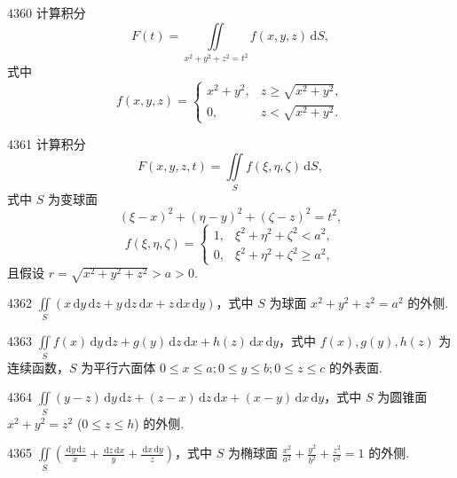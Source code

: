 \begin{prob}[M]{4360}
计算积分
\[
F(t) = \iint\limits_{x^2 + y^2 + z^2 = t^2} f(x, y, z)\,\mathrm{d}S,
\]
式中
\[
f(x, y, z) = \begin{cases} x^2 + y^2, & z \geqslant \sqrt{x^2 + y^2}, \\ 0, & z < \sqrt{x^2 + y^2}. \end{cases}
\]
\end{prob}

\begin{prob}[M]{4361}
计算积分
\[
F(x, y, z, t) = \iint\limits_S f(\xi, \eta, \zeta)\,\mathrm{d}S,
\]
式中 $S$ 为变球面
\[
(\xi - x)^2 + (\eta - y)^2 + (\zeta - z)^2 = t^2,
\]
\[
f(\xi, \eta, \zeta) = \begin{cases} 1, & \xi^2 + \eta^2 + \zeta^2 < a^2, \\ 0, & \xi^2 + \eta^2 + \zeta^2 \geqslant a^2, \end{cases}
\]
且假设 $r = \sqrt{x^2 + y^2 + z^2} > a > 0$.
\end{prob}


\begin{prob}[S]{4362}
$\iint\limits_S (x\,\mathrm{d}y\,\mathrm{d}z + y\,\mathrm{d}z\,\mathrm{d}x + z\,\mathrm{d}x\,\mathrm{d}y)$，式中 $S$ 为球面 $x^2 + y^2 + z^2 = a^2$ 的外侧.
\end{prob}

\begin{prob}[S]{4363}
$\iint\limits_S f(x)\,\mathrm{d}y\,\mathrm{d}z + g(y)\,\mathrm{d}z\,\mathrm{d}x + h(z)\,\mathrm{d}x\,\mathrm{d}y$，式中 $f(x), g(y), h(z)$ 为连续函数，$S$ 为平行六面体 $0 \leqslant x \leqslant a; 0 \leqslant y \leqslant b; 0 \leqslant z \leqslant c$ 的外表面.
\end{prob}

\begin{prob}[S]{4364}
$\iint\limits_S (y - z)\,\mathrm{d}y\,\mathrm{d}z + (z - x)\,\mathrm{d}z\,\mathrm{d}x + (x - y)\,\mathrm{d}x\,\mathrm{d}y$，式中 $S$ 为圆锥面 $x^2 + y^2 = z^2$ ($0 \leqslant z \leqslant h$) 的外侧.
\end{prob}

\begin{prob}[S]{4365}
$\iint\limits_S \left(\frac{\,\mathrm{d}y\,\mathrm{d}z}{x} + \frac{\,\mathrm{d}z\,\mathrm{d}x}{y} + \frac{\,\mathrm{d}x\,\mathrm{d}y}{z}\right)$，式中 $S$ 为椭球面 $\frac{x^2}{a^2} + \frac{y^2}{b^2} + \frac{z^2}{c^2} = 1$ 的外侧.
\end{prob}

